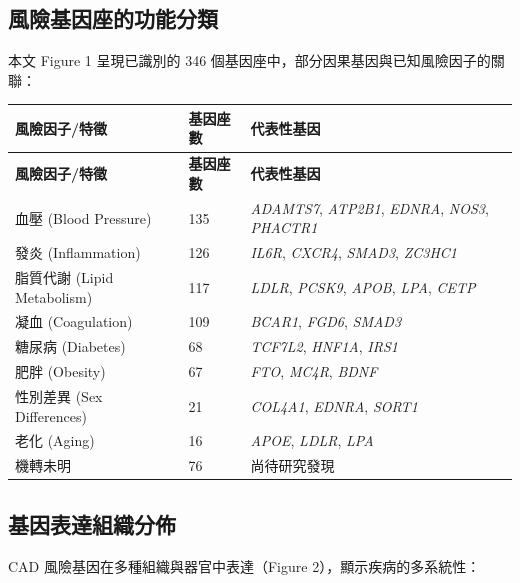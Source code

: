 \documentclass[12pt,a4paper]{article}
\begin{document}
\subsection{風險基因座的功能分類}

本文 Figure 1 呈現已識別的 346 個基因座中，部分因果基因與已知風險因子的關聯：

\begin{longtable}{p{4cm}p{2cm}p{7.5cm}}
\toprule
\textbf{風險因子/特徵} & \textbf{基因座數} & \textbf{代表性基因} \\
\midrule
\endfirsthead

\toprule
\textbf{風險因子/特徵} & \textbf{基因座數} & \textbf{代表性基因} \\
\midrule
\endhead

\bottomrule
\endfoot

血壓 (Blood Pressure) & 135 & \textit{ADAMTS7}, \textit{ATP2B1}, \textit{EDNRA}, \textit{NOS3}, \textit{PHACTR1} \\
\midrule
發炎 (Inflammation) & 126 & \textit{IL6R}, \textit{CXCR4}, \textit{SMAD3}, \textit{ZC3HC1} \\
\midrule
脂質代謝 (Lipid Metabolism) & 117 & \textit{LDLR}, \textit{PCSK9}, \textit{APOB}, \textit{LPA}, \textit{CETP} \\
\midrule
凝血 (Coagulation) & 109 & \textit{BCAR1}, \textit{FGD6}, \textit{SMAD3} \\
\midrule
糖尿病 (Diabetes) & 68 & \textit{TCF7L2}, \textit{HNF1A}, \textit{IRS1} \\
\midrule
肥胖 (Obesity) & 67 & \textit{FTO}, \textit{MC4R}, \textit{BDNF} \\
\midrule
性別差異 (Sex Differences) & 21 & \textit{COL4A1}, \textit{EDNRA}, \textit{SORT1} \\
\midrule
老化 (Aging) & 16 & \textit{APOE}, \textit{LDLR}, \textit{LPA} \\
\midrule
機轉未明 & 76 & 尚待研究發現 \\
\bottomrule
\end{longtable}

\subsection{基因表達組織分佈}

CAD 風險基因在多種組織與器官中表達（Figure 2），顯示疾病的多系統性：
\end{document}

